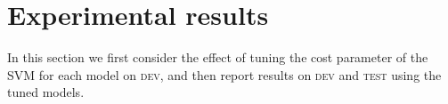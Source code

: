 \documentclass[11pt,a4paper]{article}
\newcommand{\dev}{\textsc{dev}\xspace}
\newcommand{\test}{\textsc{test}\xspace}
\begin{document}




\section{Experimental results}

In this section we first consider the effect of tuning the cost
parameter of the SVM for each model on \dev, and then report results
on \dev and \test using the tuned models.
\end{document}
